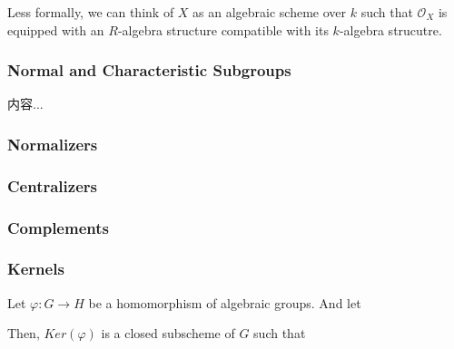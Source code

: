 \documentclass[Total.tex]{subfiles}
\begin{document}
\begin{example}
\begin{Def}
					Less formally, we can think of $X$ as an algebraic scheme over $k$ such that $\mathcal{O}_X$ is equipped with an $R$-algebra structure compatible with its $k$-algebra strucutre.
				\end{Def}
				
				\begin{Def}
					
				\end{Def}
			\subsubsection{Normal and Characteristic Subgroups}
				\begin{Def}
					内容...
				\end{Def}
			\subsubsection{Normalizers}
			\subsubsection{Centralizers}
			\subsubsection{Complements}
			\subsubsection{Kernels}
				\begin{Def}
					Let $\varphi:G\rightarrow H$ be a homomorphism of algebraic groups. And let
					\begin{center}
					\end{center}
				\end{Def}
				Then, $Ker(\varphi)$ is a closed subscheme of $G$ such that
\end{example}
\end{document}
